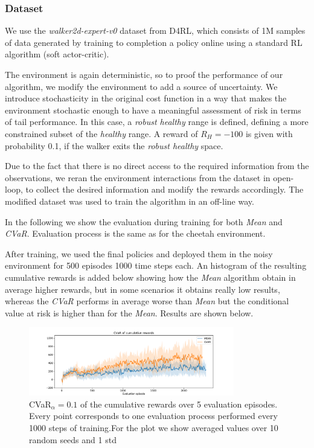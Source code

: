 \subsubsection{Dataset}
We use the \textit{walker2d-expert-v0} dataset from D4RL, which consists of 1M samples of data generated by
training to completion a policy online using a standard RL algorithm (soft actor-critic).

The environment is again deterministic, so to proof the performance of our algorithm, we modify the environment to
add a source of uncertainty. We introduce stochasticity in the original cost function in a way that 
makes the environment stochastic enough to have a meaningful assessment of risk in terms of 
tail performance.
In this case, a \textit{robust healthy} range is defined, defining a more constrained subset of the \textit{healthy} range.
A reward of $R_H=-100$ is given with probability 0.1, if the walker exits the \textit{robust healthy} space.

Due to the fact that there is no direct access to the required information from the observations,
we reran the environment interactions from the dataset in open-loop, to collect the desired information and 
modify the rewards accordingly.
The modified dataset was used to train the algorithm in an off-line way.

In the following we show the evaluation during training for both \textit{Mean} and
\textit{CVaR}.
Evaluation process is the same as for the cheetah environment.

After training, we used the final policies and deployed them in the noisy environment for 500 episodes 
1000 time steps each. An histogram of the resulting cumulative rewards is added below showing
how the \textit{Mean} algorithm obtain in average higher rewards, but in some scenarios it 
obtains really low results, whereas the \textit{CVaR} performs in average worse than \textit{Mean} 
but the conditional value at risk is higher than for the \textit{Mean}.
Results are shown below.


\begin{figure}[ht]
    \centering
    \includegraphics[width=0.8\textwidth]{images/Walker_offpolicy_expert/cvar_train_withstds.pdf}
    \caption{CVaR$_\alpha=0.1$ of the cumulative rewards over 5 evaluation episodes.
    Every point corresponds to one evaluation process performed every 1000 steps of training.For the plot we
    show averaged values over 10 random seeds and 1 std}
    \label{cvar_walker}

\end{figure}


